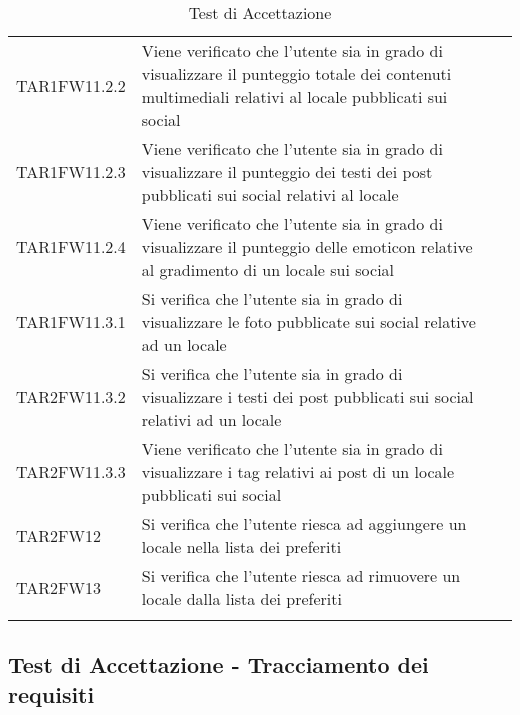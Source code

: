 \begin{longtable}{ m{}<{\centering}  m{}<{\centering}  m{}<{\centering} }
	TAR1FW11.2.2	& Viene verificato che l'utente sia in grado di visualizzare il punteggio totale dei contenuti multimediali relativi al locale pubblicati sui social & \Su \\
	TAR1FW11.2.3	& Viene verificato che l'utente sia in grado di visualizzare il punteggio dei testi dei post pubblicati sui social relativi al locale & \Su \\
	TAR1FW11.2.4	& Viene verificato che l'utente sia in grado di visualizzare il punteggio delle emoticon relative al gradimento di un locale sui social & \Su \\
	TAR1FW11.3.1	& Si verifica che l'utente sia in grado di visualizzare le foto pubblicate sui social relative ad un locale & \Su \\
	TAR2FW11.3.2	& Si verifica che l'utente sia in grado di visualizzare i testi dei post pubblicati sui social relativi ad un locale & \Su \\
	TAR2FW11.3.3	& Viene verificato che l'utente sia in grado di visualizzare i tag relativi ai post di un locale pubblicati sui social & \Su \\
	TAR2FW12 & Si verifica che l'utente riesca ad aggiungere un locale nella lista dei preferiti & \Su \\
	TAR2FW13 & Si verifica che l'utente riesca ad rimuovere un locale dalla lista dei preferiti & \Su \\
	
	\hiderowcolors \caption{Test di Accettazione}
\end{longtable}	

\subsection{Test di Accettazione - Tracciamento dei requisiti}

